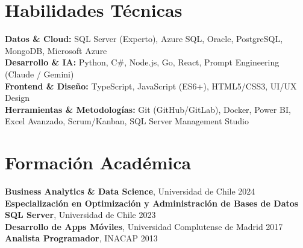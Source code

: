\documentclass[11pt,letterpaper]{article}
\begin{document}
\section{Habilidades T\'{e}cnicas}
\textbf{Datos \& Cloud:} SQL Server (Experto), Azure SQL, Oracle, PostgreSQL, MongoDB, Microsoft Azure \\
\textbf{Desarrollo \& IA:} Python, C\#, Node.js, Go, React, Prompt Engineering (Claude / Gemini) \\
\textbf{Frontend \& Diseño:} TypeScript, JavaScript (ES6+), HTML5/CSS3, UI/UX Design \\
\textbf{Herramientas \& Metodologías:} Git (GitHub/GitLab), Docker, Power BI, Excel Avanzado, Scrum/Kanban, SQL Server Management Studio

\section{Formaci\'{o}n Acad\'{e}mica}
\textbf{Business Analytics \& Data Science}, Universidad de Chile \hfill 2024 \\
\textbf{Especialización en Optimización y Administración de Bases de Datos SQL Server}, Universidad de Chile \hfill 2023 \\
\textbf{Desarrollo de Apps Móviles}, Universidad Complutense de Madrid \hfill 2017 \\
\textbf{Analista Programador}, INACAP \hfill 2013
\end{document}
